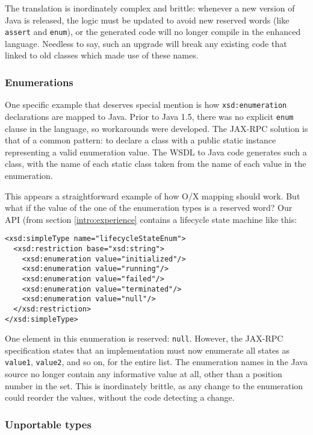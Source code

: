 The translation is inordinately complex and brittle: whenever a new
version of Java is released, the logic must be updated to avoid new
reserved words (like {\tt assert} and {\tt enum}), or the generated
code will no longer compile in the enhanced language. Needless to say,
such an upgrade will break any existing code that linked to old
classes which made use of these names.

\subsubsection{Enumerations}
\label{objections:o-x:enum}

One specific example that deserves special mention is how
{\tt xsd:enumeration} declarations are mapped to Java. Prior to
Java 1.5, there was no explicit {\tt enum} clause in the language, so
workarounds were developed. The JAX-RPC solution is that of a common
pattern: to declare a class with a public static instance representing
a valid enumeration value. The WSDL to Java code generates such a
class, with the name of each static class taken from the name of each
value in the enumeration. 

This appears a straightforward example of how O/X mapping should
work. But what if the value of the one of the enumeration types is a
reserved word?  Our API (from section \ref{intro:experience} contains
a lifecycle state machine like this:

\begin{verbatim}
<xsd:simpleType name="lifecycleStateEnum">
  <xsd:restriction base="xsd:string"> 
    <xsd:enumeration value="initialized"/> 
    <xsd:enumeration value="running"/> 
    <xsd:enumeration value="failed"/> 
    <xsd:enumeration value="terminated"/> 
    <xsd:enumeration value="null"/> 
  </xsd:restriction>
</xsd:simpleType>
\end{verbatim}

One element in this enumeration is reserved: {\tt null}. However, the
JAX-RPC specification states that an implementation must now enumerate
all states as {\tt value1}, {\tt value2}, and so on, for the entire
list.  The enumeration names in the Java source no longer contain any
informative value at all, other than a position number in the
set. This is inordinately brittle, as any change to the enumeration
could reorder the values, without the code detecting a change.

\subsubsection{Unportable types}
\label{objections:o-x:types}

